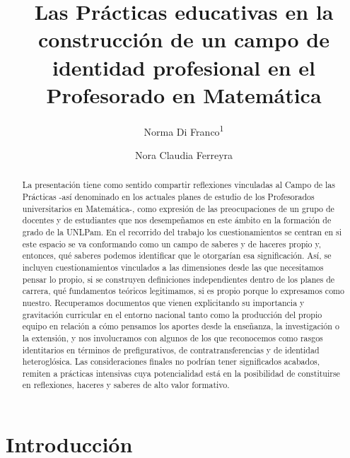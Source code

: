 \documentclass[oneside,spanish]{amsart}
\numberwithin{equation}{section}
\numberwithin{figure}{section}
\theoremstyle{definition}
\begin{document}
	
\title{Las Prácticas educativas en la construcción de un campo de identidad profesional en el Profesorado en Matemática\vspace{-2ex}}
\author[1]{Norma Di Franco\textsuperscript{1}}
\author[2]{Nora Claudia Ferreyra}
\address[1,2]{Universidad Nacional de La Pampa}

\begin{abstract}
	  La presentación tiene como sentido compartir reflexiones vinculadas al Campo de las Prácticas -así denominado en los actuales planes de estudio de los Profesorados universitarios en Matemática-, como expresión de las preocupaciones de un grupo de docentes y de estudiantes que nos desempeñamos en este ámbito en la formación de grado de la UNLPam. En el recorrido del trabajo los cuestionamientos se centran en si este espacio se va conformando como un campo de saberes y de haceres propio y, entonces, qué saberes podemos identificar que le otorgarían esa significación. Así, se incluyen cuestionamientos vinculados a las dimensiones desde las que necesitamos pensar lo propio, si se construyen definiciones independientes dentro de los planes de carrera, qué fundamentos teóricos legitimamos, si es propio porque lo expresamos como nuestro. Recuperamos documentos que vienen explicitando su importancia y gravitación curricular en el entorno nacional tanto como la producción del propio equipo en relación a cómo pensamos los aportes desde la enseñanza, la investigación o la extensión, y nos involucramos con algunos de los que reconocemos como rasgos identitarios en términos de prefigurativos, de contratransferencias y de identidad heteroglósica. Las consideraciones finales no podrían tener significados acabados, remiten a prácticas intensivas cuya potencialidad está en la posibilidad de constituirse en reflexiones, haceres y saberes de alto valor formativo. 
\end{abstract}

\maketitle
\thispagestyle{empty}

\section{Introducción}
\end{document}
